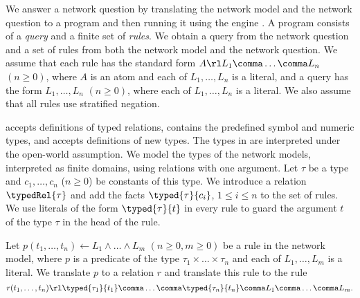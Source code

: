 We answer a network question by translating the network model and the network question to a \Datalog program and then running it using the \Datalog engine \souffle\cite{souffle}. A \Datalog program consists of a \Datalog \emph{query} and a finite set of \Datalog \textit{rules}. We obtain a query from the network question and a set of rules from both the network model and the network question. We assume that each \Datalog rule has the standard form $A\rl L_1\comma\ldots\comma L_n$ $(n\ge0)$, where $A$ is an atom and each of $L_1,\ldots,L_n$ is a literal, and a \Datalog query has the form $L_1\comma\ldots\comma L_n$ $(n\ge0)$, where each of $L_1,\ldots,L_n$ is a literal. We also assume that all \Datalog rules use stratified negation.


\souffle accepts definitions of typed relations, contains the predefined symbol and numeric types, and accepts definitions of new types. The types in \souffle are interpreted under the open-world assumption. We model the types of the network models, interpreted as finite domains, using \Datalog relations with one argument. Let $\tau$ be a type and $c_1,\ldots,c_n$ ($n\ge0$) be constants of this type. We introduce a relation $\typedRel{\tau}$ and add the facts $\typed{\tau}{c_i}$, $1\le i\le n$ to the set of \Datalog rules. We use literals of the form $\typed{\tau}{t}$ in every \Datalog rule to guard the argument $t$ of the type $\tau$ in the head of the rule. 

Let $p(t_1,\ldots,t_n)\leftarrow L_1\wedge\ldots\wedge L_m$ $(n\ge0,m\ge0)$ be a rule in the network model, where $p$ is a predicate of the type $\tau_1\times\ldots\times\tau_n$ and each of $L_1,\ldots,L_m$ is a literal. We translate $p$ to a \Datalog relation $r$ and translate this rule to the \Datalog rule $$r(t_1,\ldots,t_n)\rl\typed{\tau_1}{t_1}\comma\ldots\comma\typed{\tau_n}{t_n}\comma L_1\comma\ldots\comma L_m.$$

